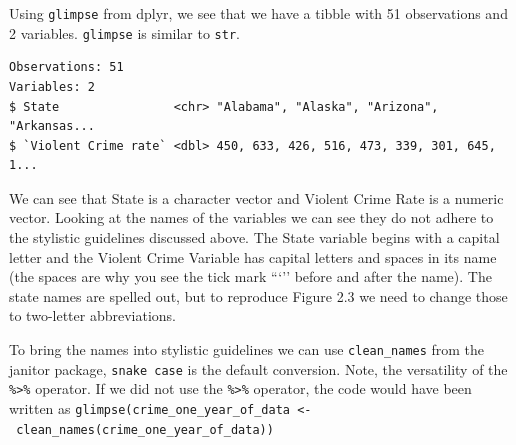 \documentclass[]{book}
\newenvironment{Shaded}{\begin{snugshade}}{\end{snugshade}}
\newcommand{\CommentTok}[1]{\textcolor[rgb]{0.56,0.35,0.01}{\textit{#1}}}
\newcommand{\DataTypeTok}[1]{\textcolor[rgb]{0.13,0.29,0.53}{#1}}
\newcommand{\DecValTok}[1]{\textcolor[rgb]{0.00,0.00,0.81}{#1}}
\newcommand{\KeywordTok}[1]{\textcolor[rgb]{0.13,0.29,0.53}{\textbf{#1}}}
\newcommand{\NormalTok}[1]{#1}
\newcommand{\OperatorTok}[1]{\textcolor[rgb]{0.81,0.36,0.00}{\textbf{#1}}}
\newcommand{\StringTok}[1]{\textcolor[rgb]{0.31,0.60,0.02}{#1}}
\begin{document}
\begin{Shaded}
\end{Shaded}

Using \texttt{glimpse} from dplyr, we see that we have a tibble with 51 observations and 2 variables. \texttt{glimpse} is similar to \texttt{str}.

\begin{Shaded}
\end{Shaded}

\begin{verbatim}
Observations: 51
Variables: 2
$ State                <chr> "Alabama", "Alaska", "Arizona", "Arkansas...
$ `Violent Crime rate` <dbl> 450, 633, 426, 516, 473, 339, 301, 645, 1...
\end{verbatim}

We can see that State is a character vector and Violent Crime Rate is a numeric vector. Looking at the names of the variables we can see they do not adhere to the stylistic guidelines discussed above. The State variable begins with a capital letter and the Violent Crime Variable has capital letters and spaces in its name (the spaces are why you see the tick mark ```'' before and after the name). The state names are spelled out, but to reproduce Figure 2.3 we need to change those to two-letter abbreviations.

To bring the names into stylistic guidelines we can use \texttt{clean\_names} from the janitor package, \texttt{snake\ case} is the default conversion. Note, the versatility of the \texttt{\%\textgreater{}\%} operator. If we did not use the \texttt{\%\textgreater{}\%} operator, the code would have been written as \texttt{glimpse(crime\_one\_year\_of\_data\ \textless{}-\ clean\_names(crime\_one\_year\_of\_data))}
\end{document}
